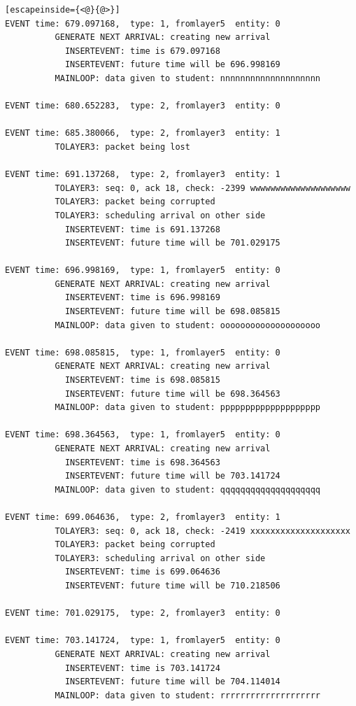 \documentclass[paper=a4, fontsize=11pt]{scrartcl}
\numberwithin{equation}{section}		%
\numberwithin{figure}{section}			%
\numberwithin{table}{section}				%
\begin{document}
\begin{lstlisting}[escapeinside={<@}{@>}]
EVENT time: 679.097168,  type: 1, fromlayer5  entity: 0
          GENERATE NEXT ARRIVAL: creating new arrival
            INSERTEVENT: time is 679.097168
            INSERTEVENT: future time will be 696.998169
          MAINLOOP: data given to student: nnnnnnnnnnnnnnnnnnnn

EVENT time: 680.652283,  type: 2, fromlayer3  entity: 0

EVENT time: 685.380066,  type: 2, fromlayer3  entity: 1
          TOLAYER3: packet being lost

EVENT time: 691.137268,  type: 2, fromlayer3  entity: 1
          TOLAYER3: seq: 0, ack 18, check: -2399 wwwwwwwwwwwwwwwwwwww
          TOLAYER3: packet being corrupted
          TOLAYER3: scheduling arrival on other side
            INSERTEVENT: time is 691.137268
            INSERTEVENT: future time will be 701.029175

EVENT time: 696.998169,  type: 1, fromlayer5  entity: 0
          GENERATE NEXT ARRIVAL: creating new arrival
            INSERTEVENT: time is 696.998169
            INSERTEVENT: future time will be 698.085815
          MAINLOOP: data given to student: oooooooooooooooooooo

EVENT time: 698.085815,  type: 1, fromlayer5  entity: 0
          GENERATE NEXT ARRIVAL: creating new arrival
            INSERTEVENT: time is 698.085815
            INSERTEVENT: future time will be 698.364563
          MAINLOOP: data given to student: pppppppppppppppppppp

EVENT time: 698.364563,  type: 1, fromlayer5  entity: 0
          GENERATE NEXT ARRIVAL: creating new arrival
            INSERTEVENT: time is 698.364563
            INSERTEVENT: future time will be 703.141724
          MAINLOOP: data given to student: qqqqqqqqqqqqqqqqqqqq

EVENT time: 699.064636,  type: 2, fromlayer3  entity: 1
          TOLAYER3: seq: 0, ack 18, check: -2419 xxxxxxxxxxxxxxxxxxxx
          TOLAYER3: packet being corrupted
          TOLAYER3: scheduling arrival on other side
            INSERTEVENT: time is 699.064636
            INSERTEVENT: future time will be 710.218506

EVENT time: 701.029175,  type: 2, fromlayer3  entity: 0

EVENT time: 703.141724,  type: 1, fromlayer5  entity: 0
          GENERATE NEXT ARRIVAL: creating new arrival
            INSERTEVENT: time is 703.141724
            INSERTEVENT: future time will be 704.114014
          MAINLOOP: data given to student: rrrrrrrrrrrrrrrrrrrr


\end{lstlisting}
\end{document}
